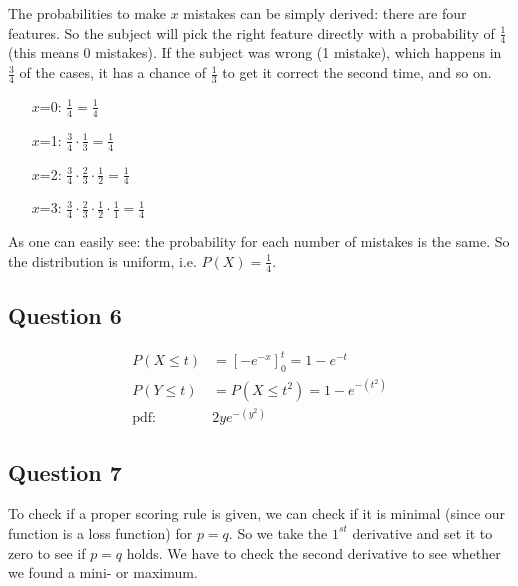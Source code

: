 \documentclass[../main/Notes.tex]{subfiles}
\begin{document}
The probabilities to make $x$ mistakes can be simply derived: there are four features. So the subject will pick the right feature directly with a probability of $\frac{1}{4}$ (this means 0 mistakes). If the subject was wrong (1 mistake), which happens in $\frac{3}{4}$ of the cases, it has a chance of $\frac{1}{3}$ to get it correct the second time, and so on.
\begin{enumerate}
	\item[$x$=0:] $\frac{1}{4} = \frac{1}{4}$ 
	\item[$x$=1:] $\frac{3}{4}\cdot\frac{1}{3} = \frac{1}{4}$ 
	\item[$x$=2:] $\frac{3}{4}\cdot\frac{2}{3}\cdot\frac{1}{2} = \frac{1}{4}$ 
	\item[$x$=3:] $\frac{3}{4}\cdot\frac{2}{3}\cdot\frac{1}{2}\cdot\frac{1}{1} = \frac{1}{4}$ 
\end{enumerate}
As one can easily see: the probability for each number of mistakes is the same. So the distribution is uniform, i.e. $P(X) = \frac{1}{4}$.



\subsection*{Question 6}
\begin{align*}
P(X\leq t) &= \left[-e^{-x}\right]_0^t=1-e^{-t} \\
P(Y\leq t) &= P(X\leq t^2)=1-e^{-\left(t^2\right)} \\
\text{pdf: }&2ye^{-\left(y^2\right)}
\end{align*}



\subsection*{Question 7}
To check if a proper scoring rule is given, we can check if it is minimal (since our function is a loss function) for $p=q$. So we take the $1^{st}$ derivative and set it to zero to see if $p=q$ holds. We have to check the second derivative to see whether we found a mini- or maximum.
\end{document}
